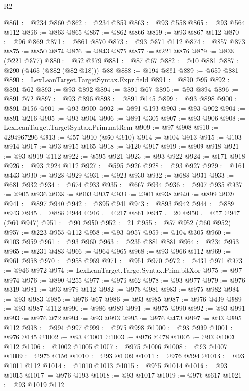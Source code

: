 \begin{lexlean}{R2}
\begin{coremodule}
@861 := @234 @860
@862 := @234 @859
@863 := @93 @558
@865 := @93 @564 @112
@866 := @863 @865
@867 := @862 @866
@869 := @93 @867 @112
@870 := @96 @869
@871 := @861 @870
@873 := @93 @871 @112
@874 := @857 @873
@875 := @850 @874
@876 := @843 @875
@877 := @221 @876
@879 := @838 (@221 @877)
@880 := @52 @879
@881 := @87 @67
@882 := @10 @881
@887 := @290 (@465 (@882 (@82 @18))) @88
@888 := @194 @881
@889 := @659 @881
@890 := LexLeanTarget.TargetSyntax.Expr.field
@891 := @890 @95
@892 := @891 @62
@893 := @93 @892
@894 := @891 @67
@895 := @93 @894
@896 := @891 @72
@897 := @93 @896
@898 := @891 @145
@899 := @93 @898
@900 := @891 @156
@901 := @93 @900
@902 := @891 @193
@903 := @93 @902
@904 := @891 @216
@905 := @93 @904
@906 := @891 @305
@907 := @93 @906
@908 := LexLeanTarget.TargetSyntax.Prim.natRem
@909 := @97 @908
@910 := 4294967296
@913 := @57 @910 (@60 @910)
@914 := @104 @913
@915 := @103 @914
@917 := @93 @915 @165
@918 := @120 @917
@919 := @909 @918
@921 := @93 @919 @112
@922 := @595 @921
@923 := @93 @922
@924 := @171 @918
@926 := @93 @924 @112
@927 := @595 @926
@928 := @93 @927
@929 := @161 @443
@930 := @928 @929
@931 := @923 @930
@932 := @688 @931
@933 := @681 @932
@934 := @674 @933
@935 := @667 @934
@936 := @907 @935
@937 := @905 @936
@938 := @903 @937
@939 := @901 @938
@940 := @899 @939
@941 := @897 @940
@942 := @895 @941
@943 := @893 @942
@944 := @889 @943
@945 := @888 @944
@946 := @217 @881
@947 := 20
@950 := @57 @947 (@60 @947)
@951 := @90 @950
@952 := 21
@955 := @57 @952 (@60 @952)
@957 := @223 @955 @112
@958 := @93 @957
@959 := @104 @305
@960 := @103 @959
@961 := @93 @960
@963 := @235 @881 @881
@964 := @234 @963
@965 := @231 @483
@966 := @964 @965
@968 := @93 @966 @112
@969 := @961 @968
@970 := @958 @969
@971 := @951 @970
@972 := @431 @971
@973 := @946 @972
@974 := LexLeanTarget.TargetSyntax.Prim.bitXor
@975 := @97 @974
@976 := @890 @255
@977 := @976 @62
@978 := @93 @977
@979 := @976 @319
@981 := @93 @979 @112
@982 := @978 @981
@983 := @975 @982
@984 := @93 @983
@985 := @976 @67
@986 := @93 @985
@987 := @976 @439
@989 := @93 @987 @112
@990 := @986 @989
@991 := @975 @990
@992 := @93 @991
@993 := @976 @72
@994 := @93 @993
@995 := @976 @473
@997 := @93 @995 @112
@998 := @994 @997
@999 := @975 @998
@1000 := @93 @999
@1001 := @976 @145
@1002 := @93 @1001
@1003 := @976 @478
@1005 := @93 @1003 @112
@1006 := @1002 @1005
@1007 := @975 @1006
@1008 := @93 @1007
@1009 := @976 @156
@1010 := @93 @1009
@1011 := @976 @594
@1013 := @93 @1011 @112
@1014 := @1010 @1013
@1015 := @975 @1014
@1016 := @93 @1015
@1017 := @976 @193
@1018 := @93 @1017
@1019 := @976 @617
@1021 := @93 @1019 @112

\end{coremodule}
\end{lexlean}
